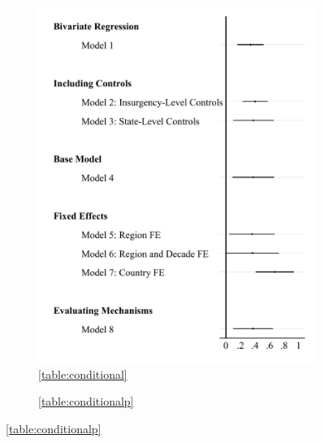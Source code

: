 \documentclass[12pt, letterpaper]{article}
\begin{document}
\newpage
\begin{figure}[h]
\renewcommand\thefigure{A.\arabic{figure}}
\caption{\textbf{Comparison of Cross-Sectional and Panel Secessionist Coefficient Estimates}}
\label{figure:coefcomp1}
\centering
	\begin{subfigure}{0.45\textwidth}
    \centering
    \caption{\autoref{table:conditional}} \label{figure:coefmaincomp}
    \includegraphics[width=\textwidth]{coefmain.pdf}
    \end{subfigure}
% 
	\begin{subfigure}{0.45\textwidth}
    \centering
    \caption{\autoref{table:conditionalp}} \label{figure:coefpanel}

\end{subfigure}
\end{figure}
\end{document}
